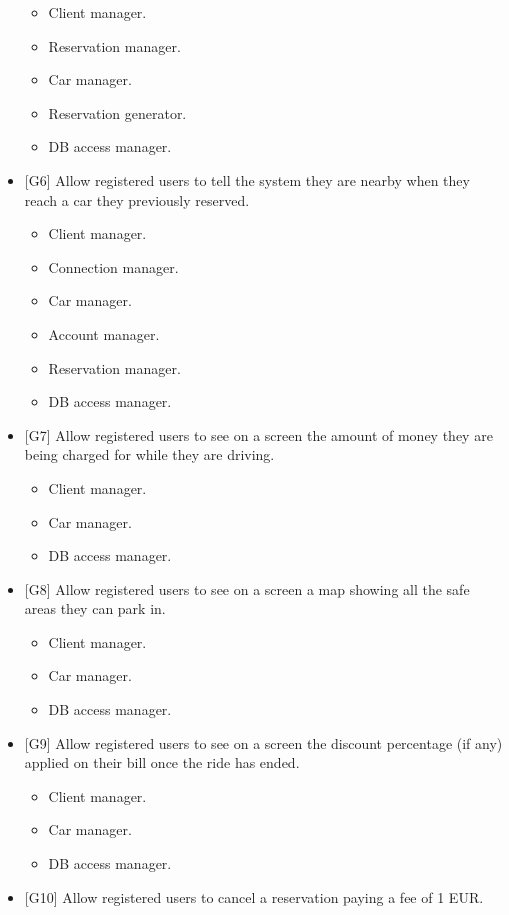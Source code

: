\begin{itemize}
\begin{itemize}
		\item Client manager.
		\item Reservation manager.
		\item Car manager.
		\item Reservation generator.
		\item DB access manager.
	\end{itemize} 
	\item {[G6]} Allow registered users to tell the system they are nearby when they reach a car they previously reserved.
	\begin{itemize}
		\item Client manager.
		\item Connection manager.
		\item Car manager.
		\item Account manager.
		\item Reservation manager.
		\item DB access manager.
	\end{itemize} 
	\item {[G7]} Allow registered users to see on a screen the amount of money they are being charged for while they are driving. 
	\begin{itemize}
		\item Client manager.
		\item Car manager.
		\item DB access manager.
	\end{itemize} 
	\item {[G8]} Allow registered users to see on a screen a map showing all the safe areas they can park in. 
	\begin{itemize}
		\item Client manager.
		\item Car manager.
		\item DB access manager.
	\end{itemize} 
	\item {[G9]} Allow registered users to see on a screen the discount percentage (if any) applied on their bill once the ride has ended.
	\begin{itemize}
		\item Client manager.
		\item Car manager.
		\item DB access manager.
	\end{itemize} 
	\item {[G10]} Allow registered users to cancel a reservation paying a fee of 1 EUR.
	\begin{itemize}

\end{itemize}
\end{itemize}
